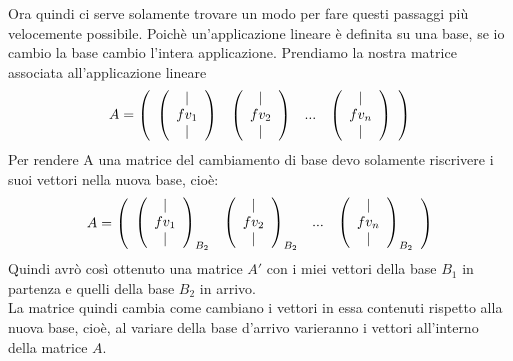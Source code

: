 \documentclass[]{article}
\begin{document}
Ora quindi ci serve solamente trovare un modo per fare questi passaggi più velocemente possibile. Poichè un'applicazione lineare è definita su una base, se io cambio la base cambio l'intera applicazione. Prendiamo la nostra matrice associata all'applicazione lineare $$A = \left ( 
	\begin{array}{c c c c}
		\left(\begin{array}{c}
			| \\
			fv_1\\
			|
			\end{array}
		\right) &
		\left(\begin{array}{c}
			| \\
			fv_2\\
			|
			\end{array}
		\right) & ... & \left(\begin{array}{c}
			| \\
			fv_n\\
			|
			\end{array}
		\right) 
	\end{array}
\right)
$$
Per rendere A una matrice del cambiamento di base devo solamente riscrivere i suoi vettori nella nuova base, cioè:
$$A = \left ( 
	\begin{array}{c c c c}
		\left(\begin{array}{c}
			| \\
			fv_1\\
			|
			\end{array}
		\right)_{B_2} &
		\left(\begin{array}{c}
			| \\
			fv_2\\
			|
			\end{array}
		\right)_{B_2} & ... & \left(\begin{array}{c}
			| \\
			fv_n\\
			|
			\end{array}
		\right)_{B_2} 
	\end{array}
\right)
$$
Quindi avrò così ottenuto una matrice $A'$ con i miei vettori della base $B_1$ in partenza e quelli della base $B_2$ in arrivo. \\La matrice quindi cambia come cambiano i vettori in essa contenuti rispetto alla nuova base, cioè, al variare della base d'arrivo varieranno i vettori all'interno della matrice $A$.
\end{document}
